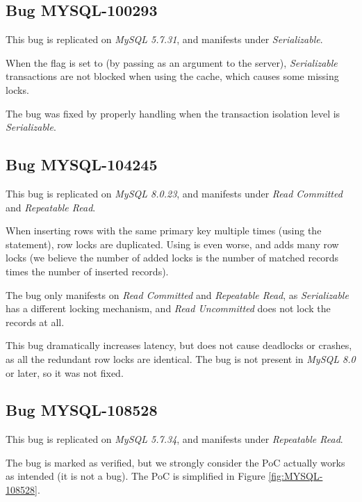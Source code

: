 \subsection*{Bug MYSQL-100293}

This bug is replicated on \textit{MySQL 5.7.31}, and manifests under \textit{Serializable}.

When the  flag is set to  (by passing  as an argument to the server), \textit{Serializable} transactions are not blocked when using the cache, which causes some missing locks.

The bug was fixed by properly handling  when the transaction isolation level is \textit{Serializable}.

\subsection*{Bug MYSQL-104245}


This bug is replicated on \textit{MySQL 8.0.23}, and manifests under \textit{Read Committed} and \textit{Repeatable Read}.

When inserting rows with the same primary key multiple times (using the  statement), row locks are duplicated. Using  is even worse, and adds many row locks (we believe the number of added locks is the number of matched records times the number of inserted records).

The bug only manifests on \textit{Read Committed} and \textit{Repeatable Read}, as \textit{Serializable} has a different locking mechanism, and \textit{Read Uncommitted} does not lock the records at all.

This bug dramatically increases latency, but does not cause deadlocks or crashes, as all the redundant row locks are identical. The bug is not present in \textit{MySQL 8.0} or later, so it was not fixed.

\subsection*{Bug MYSQL-108528}

This bug is replicated on \textit{MySQL 5.7.34}, and manifests under \textit{Repeatable Read}.

The bug is marked as verified, but we strongly consider the PoC actually works as intended (it is not a bug). The PoC is simplified in Figure \ref{fig:MYSQL-108528}.

